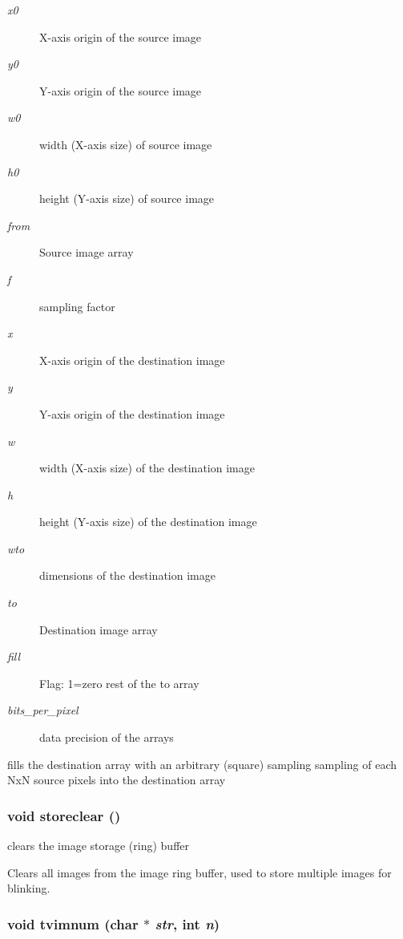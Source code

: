 \begin{Desc}
\item[Parameters:]
\begin{description}
\item[{\em x0}]X-axis origin of the source image \item[{\em y0}]Y-axis origin of the source image \item[{\em w0}]width (X-axis size) of source image \item[{\em h0}]height (Y-axis size) of source image \item[{\em from}]Source image array \item[{\em f}]sampling factor \item[{\em x}]X-axis origin of the destination image \item[{\em y}]Y-axis origin of the destination image \item[{\em w}]width (X-axis size) of the destination image \item[{\em h}]height (Y-axis size) of the destination image \item[{\em wto}]dimensions of the destination image \item[{\em to}]Destination image array \item[{\em fill}]Flag: 1=zero rest of the to array \item[{\em bits\_\-per\_\-pixel}]data precision of the arrays\end{description}
\end{Desc}
fills the destination array with an arbitrary (square) sampling sampling of each Nx\-N source pixels into the destination array 
\subsubsection{\setlength{\rightskip}{0pt plus 5cm}void storeclear ()}\label{xtvutils_8c_a182}


clears the image storage (ring) buffer 

Clears all images from the image ring buffer, used to store multiple images for blinking. 
\subsubsection{\setlength{\rightskip}{0pt plus 5cm}void tvimnum (char $\ast$ {\em str}, int {\em n})}\label{xtvutils_8c_a196}


